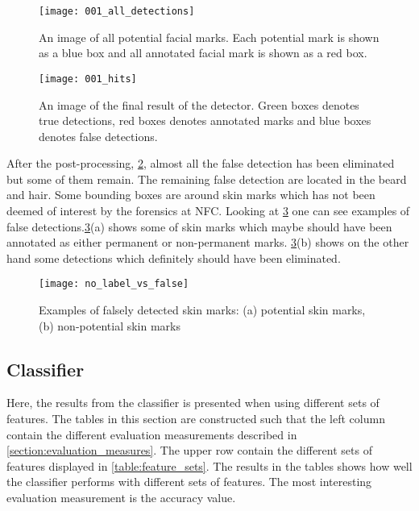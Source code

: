  
\FloatBarrier
\begin{figure}[h]
	\centering
	\texttt{[image: 001\_all\_detections]}
	\caption{An image of all potential facial marks. Each potential mark is shown as a blue box and all annotated facial mark is shown as a red box. \label{fig:all_detections}}
\end{figure}
\FloatBarrier

\FloatBarrier
\begin{figure}[h]
	\centering
	\texttt{[image: 001\_hits]}
	\caption{An image of the final result of the detector. Green boxes denotes true detections, red boxes denotes annotated marks and blue boxes denotes false detections. \label{fig:all_hits}}
\end{figure}
\FloatBarrier

After the post-processing, \cref{fig:all_hits}, almost all the false detection has been eliminated but some of them remain. The remaining false detection are located in the beard and hair. Some bounding boxes are around skin marks which has not been deemed of interest by the forensics at NFC. Looking at \cref{fig:no_label_vs_false} one can see examples of false detections.\cref{fig:no_label_vs_false}(a) shows some of skin marks which maybe should have been annotated as either permanent or non-permanent marks. \cref{fig:no_label_vs_false}(b) shows on the other hand some detections which definitely should have been eliminated.    

\FloatBarrier
\begin{figure}[h]
	\centering
	\texttt{[image: no\_label\_vs\_false]}
	\caption{Examples of falsely detected skin marks: (a) potential skin marks, (b) non-potential skin marks
		 \label{fig:no_label_vs_false}}
\end{figure}
\FloatBarrier

\subsection{Classifier}

Here, the results from the classifier is presented when using different sets of features. The tables in this section are constructed such that the left column contain the different evaluation measurements described in \cref{section:evaluation_measures}. The upper row contain the different sets of features displayed in \cref{table:feature_sets}. The results in the tables shows how well the classifier performs with different sets of features. The most interesting evaluation measurement is the accuracy value. 

